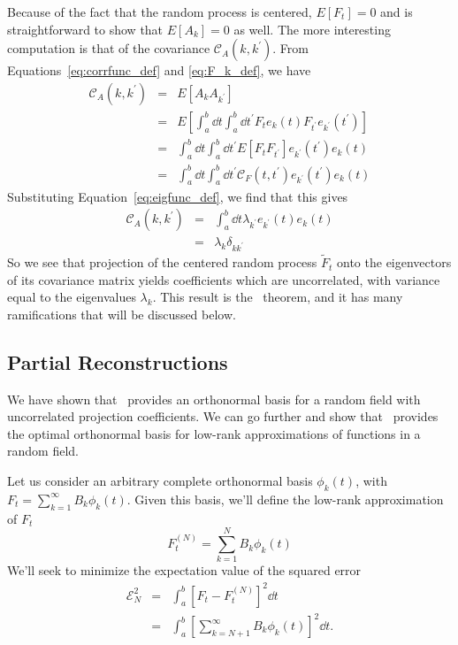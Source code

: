 Because of the fact that the random process is centered,
 $E[F_t] = 0$ and
is straightforward to show that $E[A_k] = 0$ as well.  The more interesting
computation is that of the covariance $\mathcal{C}_A(k, k^\prime)$.
From Equations~\ref{eq:corrfunc_def} and \ref{eq:F_k_def}, we have
\begin{eqnarray}
  \mathcal{C}_A(k, k^\prime)
  &=& E[A_k A_{k^\prime}]\nonumber\\
  &=& E\left[\int_a^b \dd t \int_a^b \dd t^\prime
    {F}_t e_k(t)
    {F}_{t^\prime} e_{k^\prime}(t^\prime)\right] \nonumber\\
  &=& \int_a^b \dd t \int_a^b \dd t^\prime
    E[{F}_t {F}_{t^\prime}]
    e_{k^\prime}(t^\prime) e_k(t) \nonumber\\
  &=& \int_a^b \dd t \int_a^b \dd t^\prime
    \mathcal{C}_F(t, t^\prime)
    e_{k^\prime}(t^\prime) e_k(t) \nonumber
\end{eqnarray}
Substituting Equation~\ref{eq:eigfunc_def}, we find that this gives
\begin{eqnarray}
  \label{eq:cov_A}
  \mathcal{C}_A(k, k^\prime)
  &=& \int_a^b \dd t \lambda_{k^\prime} e_{k^\prime}(t) e_k(t) \nonumber\\
  &=& \lambda_k \delta_{kk^\prime}
\end{eqnarray}
So we see that projection of the centered random process $\tilde{F}_t$ onto
the eigenvectors of its covariance matrix yields coefficients which
are uncorrelated, with variance equal to the eigenvalues $\lambda_k$.
This result is the \KL\ theorem, and it has many ramifications that will
be discussed below.

\subsection{Partial Reconstructions}
\label{sec:partial_recons}
We have shown that \KL\ provides an orthonormal basis for a random field
with uncorrelated projection coefficients.  We can go further and show
that \KL\ provides the
optimal orthonormal basis for low-rank approximations of functions in
a random field.

Let us consider an arbitrary complete orthonormal basis
$\phi_k(t)$, with $F_t = \sum_{k=1}^\infty B_k\phi_k(t)$.
Given this basis, we'll define the low-rank approximation of $F_t$
\begin{equation}
  F^{(N)}_t = \sum_{k=1}^N B_k\phi_k(t)
\end{equation}
We'll seek to minimize the expectation value of the squared error
\begin{eqnarray}
  \mathcal{E}^2_N &=& \int_a^b \left[F_t - F_t^{(N)}\right]^2 \dd t
  \nonumber\\
  &=& \int_a^b \left[\sum_{k = N + 1}^\infty B_k \phi_k(t)\right]^2 \dd t.
\end{eqnarray}


